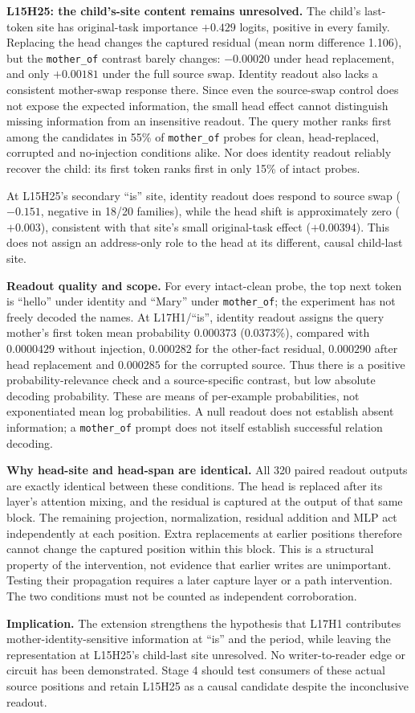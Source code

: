 \textbf{L15H25: the child's-site content remains unresolved.} The child's last-token
site has original-task importance $+0.429$ logits, positive in every family. Replacing
the head changes the captured residual (mean norm difference 1.106), but the
\texttt{mother\_of} contrast barely changes: $-0.00020$ under head replacement,
and only $+0.00181$ under the full source swap. Identity readout also lacks a
consistent mother-swap response there. Since even the source-swap control does not
expose the expected information, the small head effect cannot distinguish missing
information from an insensitive readout. The query mother ranks first among the
candidates in 55\% of \texttt{mother\_of} probes for clean, head-replaced, corrupted
and no-injection conditions alike. Nor does identity readout reliably recover the
child: its first token ranks first in only 15\% of intact probes.

At L15H25's secondary ``is'' site, identity readout does respond to source swap
($-0.151$, negative in 18/20 families), while the head shift is approximately zero
($+0.003$), consistent with that site's small original-task effect ($+0.00394$).
This does not assign an address-only role to the head at its different, causal
child-last site.

\textbf{Readout quality and scope.} For every intact-clean probe, the top next token
is ``hello'' under identity and ``Mary'' under \texttt{mother\_of}; the experiment
has not freely decoded the names. At L17H1/``is'', identity readout assigns the query
mother's first token mean probability $0.000373$ (0.0373\%), compared with $0.0000429$
without injection, $0.000282$ for the other-fact residual, $0.000290$ after head
replacement and $0.000285$ for the corrupted source. Thus there is a positive
probability-relevance check and a source-specific contrast, but low absolute decoding
probability. These are means of per-example probabilities, not exponentiated mean
log probabilities. A null readout does not establish absent information; a
\texttt{mother\_of} prompt does not itself establish successful relation decoding.

\textbf{Why head-site and head-span are identical.} All 320 paired readout outputs
are exactly identical between these conditions. The head is replaced after its
layer's attention mixing, and the residual is captured at the output of that same
block. The remaining projection, normalization, residual addition and MLP act
independently at each position. Extra replacements at earlier positions therefore
cannot change the captured position within this block. This is a structural property
of the intervention, not evidence that earlier writes are unimportant. Testing their
propagation requires a later capture layer or a path intervention. The two conditions
must not be counted as independent corroboration.

\textbf{Implication.} The extension strengthens the hypothesis that L17H1 contributes
mother-identity-sensitive information at ``is'' and the period, while leaving the
representation at L15H25's child-last site unresolved. No writer-to-reader edge or
circuit has been demonstrated. Stage 4 should test consumers of these actual source
positions and retain L15H25 as a causal candidate despite the inconclusive readout.

